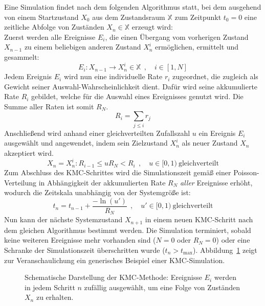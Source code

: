 Eine Simulation findet nach dem folgenden Algorithmus statt, bei dem ausgehend von einem Startzustand $X_0$ aus dem Zustandsraum $\mathbb{X}$ zum Zeitpunkt $t_0 = 0$ eine zeitliche Abfolge von Zuständen $X_n \in \mathbb{X}$ erzeugt wird:\\
Zuerst werden alle Ereignisse $E_i$, die einen Übergang vom vorherigen Zustand $X_{n-1}$ zu einem beliebigen anderen Zustand $X_n^i$ ermöglichen, ermittelt und gesammelt:
\begin{equation}
  E_i : X_{n-1} \rightarrow X_n^i \in \mathbb{X} ~~,\quad i \in [1, N]
\end{equation}
Jedem Ereignis $E_i$ wird nun eine individuelle Rate $r_i$ zugeordnet, die zugleich als Gewicht seiner Auswahl-Wahrscheinlichkeit dient.
Dafür wird seine akkumulierte Rate $R_i$ gebildet, welche für die Auswahl eines Ereignisses genutzt wird.
Die Summe aller Raten ist somit $R_N$.
\begin{equation}
  R_i = \sum_{j \le i}{r_j}
\end{equation}
Anschließend wird anhand einer gleichverteilten Zufallszahl $u$ ein Ereignis $E_i$ ausgewählt und angewendet, indem sein Zielzustand $X_n^i$ als neuer Zustand $X_n$ akzeptiert wird.
\begin{equation}
  X_n = X_n^i : R_{i-1} \le u R_N < R_i ~~,\quad u \in [0,1)~\text{gleichverteilt}
\end{equation}
Zum Abschluss des KMC-Schrittes wird die Simulationszeit gemäß einer Poisson-Verteilung in Abhängigkeit der akkumulierten Rate $R_N$ \textit{aller} Ereignisse erhöht, wodurch die Zeitskala unabhängig von der Systemgröße ist:
\begin{equation}
  t_n = t_{n-1} + \frac{-\ln(u')}{R_N} ~~,\quad u' \in [0,1)~\text{gleichverteilt}
\end{equation}
Nun kann der nächste Systemzustand $X_{n+1}$ in einem neuen KMC-Schritt nach dem gleichen Algorithmus bestimmt werden.
Die Simulation terminiert, sobald keine weiteren Ereignisse mehr vorhanden sind ($N=0$ oder $R_N=0$) oder eine Schranke der Simulationszeit überschritten wurde ($t_n > t_\text{max}$).
Abbildung~\ref{fig:kmctree} zeigt zur Veranschaulichung ein generisches Beispiel einer KMC-Simulation.

\begin{figure}
  \centering

  \def\svgwidth{14cm}
  

  \caption[Schematische Darstellung der KMC-Methode]{
    Schematische Darstellung der KMC-Methode:
    Ereignisse $E_i$ werden in jedem Schritt $n$ zufällig ausgewählt, um eine Folge von Zuständen $X_n$ zu erhalten.
  }

  \label{fig:kmctree}
\end{figure}

